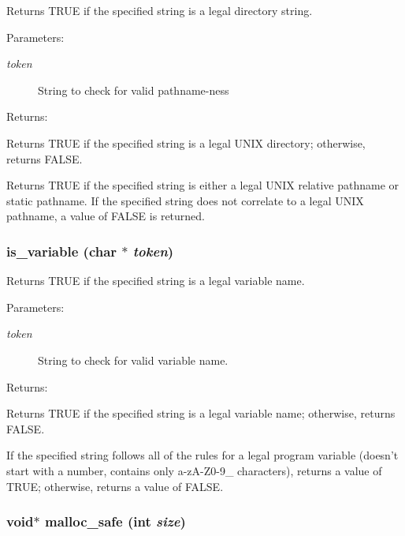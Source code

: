 Returns TRUE if the specified string is a legal directory string.

\begin{Desc}
\item[Parameters: ]\par
\begin{description}
\item[{\em 
token}]String to check for valid pathname-ness \end{description}
\end{Desc}
\begin{Desc}
\item[Returns: ]\par
Returns TRUE if the specified string is a legal UNIX directory; otherwise, returns FALSE.\end{Desc}
Returns TRUE if the specified string is either a legal UNIX relative pathname or static pathname. If the specified string does not correlate to a legal UNIX pathname, a value of FALSE is returned. 
\subsubsection{ is\_\-variable (char $\ast$ {\em token})}\label{util_8c_a7}


Returns TRUE if the specified string is a legal variable name.

\begin{Desc}
\item[Parameters: ]\par
\begin{description}
\item[{\em 
token}]String to check for valid variable name. \end{description}
\end{Desc}
\begin{Desc}
\item[Returns: ]\par
Returns TRUE if the specified string is a legal variable name; otherwise, returns FALSE.\end{Desc}
If the specified string follows all of the rules for a legal program variable (doesn't start with a number, contains only a-z\-A-Z0-9\_\- characters), returns a value of TRUE; otherwise, returns a value of FALSE. 
\subsubsection{\setlength{\rightskip}{0pt plus 5cm}void$\ast$ malloc\_\-safe (int {\em size})}\label{util_8c_a16}


